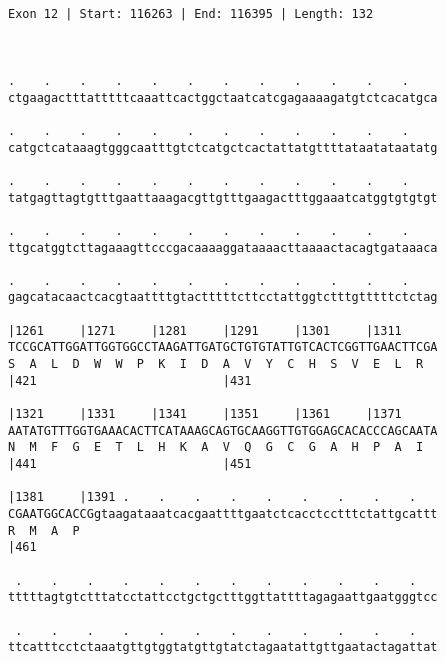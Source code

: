 \documentclass{article}
\begin{document}
\begin{Verbatim}
               
 
Exon 12 | Start: 116263 | End: 116395 | Length: 132



.    .    .    .    .    .    .    .    .    .    .    .    
ctgaagactttatttttcaaattcactggctaatcatcgagaaaagatgtctcacatgca
                                                            
.    .    .    .    .    .    .    .    .    .    .    .    
catgctcataaagtgggcaatttgtctcatgctcactattatgttttataatataatatg
                                                            
.    .    .    .    .    .    .    .    .    .    .    .    
tatgagttagtgtttgaattaaagacgttgtttgaagactttggaaatcatggtgtgtgt
                                                            
.    .    .    .    .    .    .    .    .    .    .    .    
ttgcatggtcttagaaagttcccgacaaaaggataaaacttaaaactacagtgataaaca
                                                            
.    .    .    .    .    .    .    .    .    .    .    .    
gagcatacaactcacgtaattttgtactttttcttcctattggtctttgtttttctctag
                                                            
|1261     |1271     |1281     |1291     |1301     |1311     
TCCGCATTGGATTGGTGGCCTAAGATTGATGCTGTGTATTGTCACTCGGTTGAACTTCGA
S  A  L  D  W  W  P  K  I  D  A  V  Y  C  H  S  V  E  L  R  
|421                          |431                          
  
|1321     |1331     |1341     |1351     |1361     |1371     
AATATGTTTGGTGAAACACTTCATAAAGCAGTGCAAGGTTGTGGAGCACACCCAGCAATA
N  M  F  G  E  T  L  H  K  A  V  Q  G  C  G  A  H  P  A  I  
|441                          |451                          
  
|1381     |1391 .    .    .    .    .    .    .    .    .   
CGAATGGCACCGgtaagataaatcacgaattttgaatctcacctcctttctattgcattt
R  M  A  P                                                  
|461                                                        
  
 .    .    .    .    .    .    .    .    .    .    .    .   
tttttagtgtctttatcctattcctgctgctttggttattttagagaattgaatgggtcc
                                                            
 .    .    .    .    .    .    .    .    .    .    .    .   
ttcatttcctctaaatgttgtggtatgttgtatctagaatattgttgaatactagattat
                                                            

\end{Verbatim}
\end{document}
